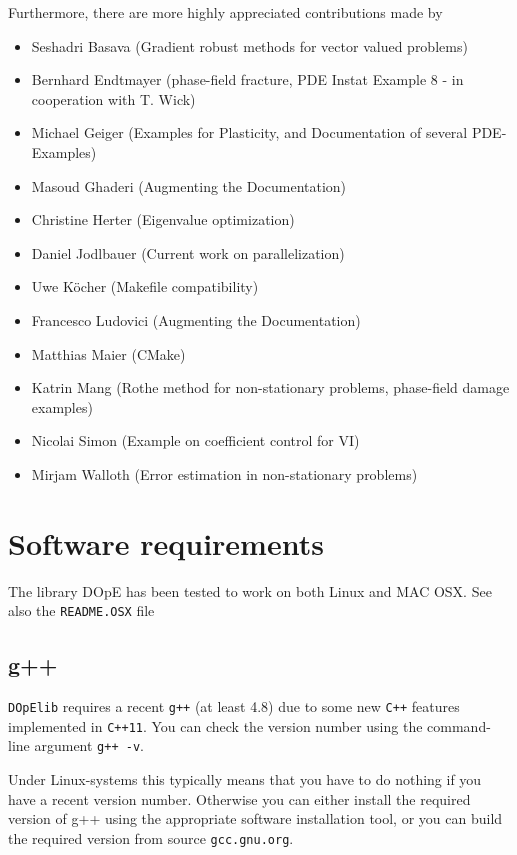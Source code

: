 Furthermore, there are more highly appreciated contributions
made by %
\begin{itemize}
  \item Seshadri Basava (Gradient robust methods for vector valued problems)
  \item Bernhard Endtmayer (phase-field fracture, PDE Instat Example 8 - in cooperation with T. Wick)
  \item Michael Geiger (Examples for Plasticity, and Documentation of several PDE-Examples)
  \item Masoud Ghaderi (Augmenting the Documentation)
  \item Christine Herter (Eigenvalue optimization)
  \item Daniel Jodlbauer (Current work on parallelization)
  \item Uwe K{\"o}cher (Makefile compatibility)
  \item Francesco Ludovici (Augmenting the Documentation)
  \item Matthias Maier (CMake)
  \item Katrin Mang (Rothe method for non-stationary problems,
    phase-field damage examples)
  \item Nicolai Simon (Example on coefficient control for VI)
  \item Mirjam Walloth (Error estimation in non-stationary problems)
  \end{itemize}


\section{Software requirements}
The library DOpE has been tested to work on both Linux and 
MAC OSX. See also the \texttt{README.OSX} file 

\subsection{g++}
\texttt{DOpElib} requires a recent \texttt{g++} (at least 4.8) due to 
some new \texttt{C++} features implemented in \texttt{C++11}. 
You can check the version number using the command-line argument \texttt{g++ -v}.

Under Linux-systems this typically means that you have to do nothing if you have a recent 
version number. Otherwise you can either install the required version of g++ using the 
appropriate software installation tool, or you can build the required version from 
source \texttt{gcc.gnu.org}.


